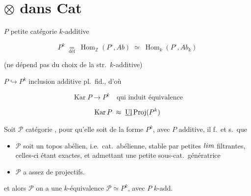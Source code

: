 \documentclass[11pt,a4paper]{article}
\begin{document}

\section{$\otimes$ dans Cat}



$P$ petite catégorie $k$-additive

\[
P^{k} \;\underset{\text{déf}}{=}\; \operatorname{Hom}_{\mathbb{Z}}(P^{\circ}, Ab)
\;\simeq\; \operatorname{Hom}_k(P^{\circ}, Ab_k)
\]

(ne dépend pas du choix de la str.\ $k$-additive)

$P \hookrightarrow P^{k}$ inclusion additive pl.\ fid., d'où

\[
\operatorname{Kar} P \longrightarrow P^{k} \quad \text{qui induit équivalence}
\]


\[
\operatorname{Kar} P \;\approx\; \uncertain{\mathrm{Ul}}\operatorname{Proj}(P^{k})
\]


Soit  $\mathcal{P}$ catégorie , pour qu'elle soit
 de la forme $P^{k}$, avec $P$ additive, il f.\ et s.\ que

\begin{itemize}
  \item[a)] $\mathcal{P}$ soit un topos abélien, i.e.\ cat.\ abélienne, stable
    par petites $\varinjlim$ filtrantes, celles-ci étant exactes, et admettant
    une petite sous-cat.\ génératrice
  \item[b)] $\mathcal{P}$ a assez de projectifs.
\end{itemize}

 et alors $\mathcal{P}$ on a \ill{} une $k$-équivalence
$\mathcal{P} \simeq P^{k}$, avec $P$ $k$-add.
\end{document}
